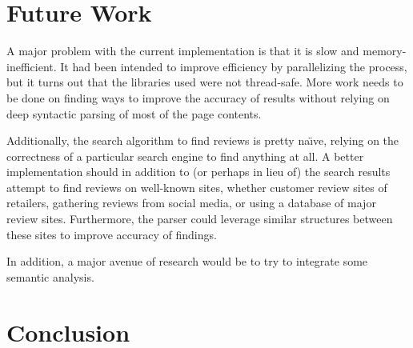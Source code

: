 \documentclass{article}
\begin{document}

\section{Future Work}

A major problem with the current implementation is that it is slow and memory-
inefficient. It had been intended to improve efficiency by parallelizing the
process, but it turns out that the libraries used were not thread-safe. More
work needs to be done on finding ways to improve the accuracy of results
without relying on deep syntactic parsing of most of the page contents.

Additionally, the search algorithm to find reviews is pretty na\"{\i}ve,
relying on the correctness of a particular search engine to find anything at
all. A better implementation should in addition to (or perhaps in lieu of) the
search results attempt to find reviews on well-known sites, whether customer
review sites of retailers, gathering reviews from social media, or using a
database of major review sites. Furthermore, the parser could leverage similar
structures between these sites to improve accuracy of findings.

In addition, a major avenue of research would be to try to integrate some
semantic analysis.


\section{Conclusion} %




\tocsection


\end{document}
